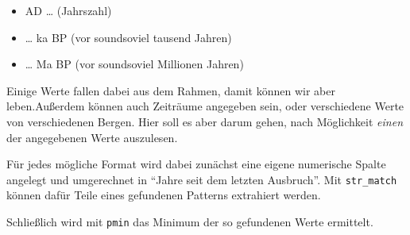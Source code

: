 \documentclass[
  ngerman,
]{article}
\providecommand{\tightlist}{%
  \setlength{\itemsep}{0pt}\setlength{\parskip}{0pt}}
\begin{document}
\begin{itemize}
\tightlist
\item
  AD \ldots{} (Jahrszahl)
\item
  \ldots{} ka BP (vor soundsoviel tausend Jahren)
\item
  \ldots{} Ma BP (vor soundsoviel Millionen Jahren)
\end{itemize}

Einige Werte fallen dabei aus dem Rahmen, damit können wir aber leben.Außerdem können auch Zeiträume angegeben sein, oder verschiedene Werte von verschiedenen Bergen. Hier soll es aber darum gehen, nach Möglichkeit \emph{einen} der angegebenen Werte auszulesen.

Für jedes mögliche Format wird dabei zunächst eine eigene numerische Spalte angelegt und umgerechnet in ``Jahre seit dem letzten Ausbruch''. Mit \texttt{str\_match} können dafür Teile eines gefundenen Patterns extrahiert werden.

Schließlich wird mit \texttt{pmin} das Minimum der so gefundenen Werte ermittelt.
\end{document}
